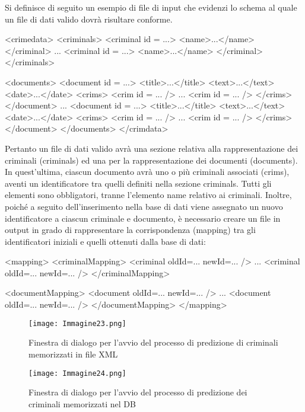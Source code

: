 Si definisce di seguito un esempio di file di input che evidenzi lo schema al quale un file di dati valido dovrà risultare conforme.

\footnotesize
\begin{verbatimtab}[4]
<crimedata>
	<criminals>
		<criminal id = ...>
			<name>...</name>
		</criminal>
		...
		<criminal id = ...>
			<name>...</name>
		</criminal>
	</criminals>
	
	<documents>
		<document id = ...>
			<title>...</title>
			<text>...</text>
			<date>...</date>
			<crims>
				<crim id = ... />
				...
				<crim id = ... />
			</crims>
		</document>
		...
		<document id = ...>
			<title>...</title>
			<text>...</text>
			<date>...</date>
			<crims>
				<crim id = ... />
				...
				<crim id = ... />
			</crims>
		</document>
	</documents>
</crimdata>
\end{verbatimtab}
\normalsize

Pertanto un file di dati valido avrà una sezione relativa alla rappresentazione dei criminali (criminals) ed una per la rappresentazione dei documenti
(documents). In quest'ultima, ciascun documento avrà uno o più criminali associati (crims), aventi un identificatore tra quelli definiti nella sezione criminals. Tutti gli elementi sono obbligatori, tranne l'elemento name relativo ai criminali.
Inoltre, poiché a seguito dell'inserimento nella base di dati viene assegnato un nuovo identificatore a ciascun criminale e documento, è necessario creare
un file in output in grado di rappresentare la corrispondenza (mapping) tra gli identificatori iniziali e quelli ottenuti dalla base di dati:
\footnotesize
\begin{verbatimtab}[4]
<mapping>
	<criminalMapping>
		<criminal oldId=... newId=... />
		...
		<criminal oldId=... newId=... />
	</criminalMapping>
	
	<documentMapping>
		<document oldId=... newId=... />
		...
		<document oldId=... newId=... />
	</documentMapping>
</mapping>
\end{verbatimtab}
\normalsize

\begin{figure}[H]
	\centering
	\texttt{[image: Immagine23.png]}
	\caption{Finestra di dialogo per l'avvio del processo di predizione di criminali memorizzati in file XML}
	\label{}
\end{figure}
 \begin{figure}[H]
	\centering
	\texttt{[image: Immagine24.png]}
	\caption{Finestra di dialogo per l'avvio del processo di predizione dei criminali memorizzati nel DB}
	\label{}
\end{figure}

